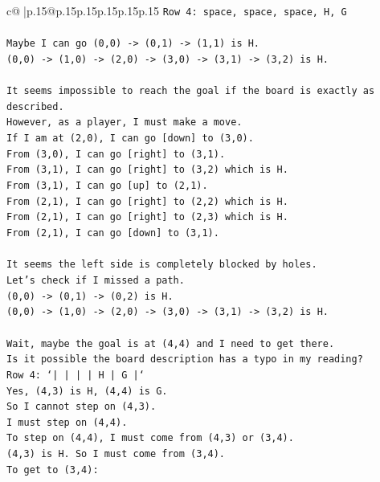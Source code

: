 \documentclass{article}
\begin{document}
{\begin{supertabular}{c@{$\;$}|p{.15\linewidth}@{}p{.15\linewidth}p{.15\linewidth}p{.15\linewidth}p{.15\linewidth}p{.15\linewidth}}
{{{\texttt{Row 4: space, space, space, H, G} \\
\\ 
\texttt{Maybe I can go (0,0) {-}> (0,1) {-}> (1,1) is H.} \\
\texttt{(0,0) {-}> (1,0) {-}> (2,0) {-}> (3,0) {-}> (3,1) {-}> (3,2) is H.} \\
\\ 
\texttt{It seems impossible to reach the goal if the board is exactly as described.} \\
\texttt{However, as a player, I must make a move.} \\
\texttt{If I am at (2,0), I can go {[}down{]} to (3,0).} \\
\texttt{From (3,0), I can go {[}right{]} to (3,1).} \\
\texttt{From (3,1), I can go {[}right{]} to (3,2) which is H.} \\
\texttt{From (3,1), I can go {[}up{]} to (2,1).} \\
\texttt{From (2,1), I can go {[}right{]} to (2,2) which is H.} \\
\texttt{From (2,1), I can go {[}right{]} to (2,3) which is H.} \\
\texttt{From (2,1), I can go {[}down{]} to (3,1).} \\
\\ 
\texttt{It seems the left side is completely blocked by holes.} \\
\texttt{Let's check if I missed a path.} \\
\texttt{(0,0) {-}> (0,1) {-}> (0,2) is H.} \\
\texttt{(0,0) {-}> (1,0) {-}> (2,0) {-}> (3,0) {-}> (3,1) {-}> (3,2) is H.} \\
\\ 
\texttt{Wait, maybe the goal is at (4,4) and I need to get there.} \\
\texttt{Is it possible the board description has a typo in my reading?} \\
\texttt{Row 4: `|     |     |     |  H  |  G  |`} \\
\texttt{Yes, (4,3) is H, (4,4) is G.} \\
\texttt{So I cannot step on (4,3).} \\
\texttt{I must step on (4,4).} \\
\texttt{To step on (4,4), I must come from (4,3) or (3,4).} \\
\texttt{(4,3) is H. So I must come from (3,4).} \\
\texttt{To get to (3,4):} \\
}}}
\end{supertabular}}
\end{document}
